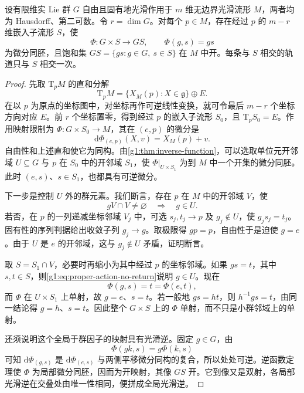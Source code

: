 \begin{lemma}\label{g1:lem:free-proper-local-product}
	设有限维实 Lie 群 \(G\) 自由且固有地光滑作用于 \(m\) 维无边界光滑流形 \(M\)，两者均为 Hausdorff、第二可数。令 \(r=\dim G\)。对每个 \(p\in M\)，存在经过 \(p\) 的 \(m-r\) 维嵌入子流形 \(S\)，使
	\begin{equation}\label{g1:eq:free-action-local-product}
		\Phi:G\times S\longrightarrow GS,\qquad \Phi(g,s)=gs
	\end{equation}
	为微分同胚，且饱和集 \(GS=\{gs:g\in G,\ s\in S\}\) 在 \(M\) 中开。每条与 \(S\) 相交的轨道只与 \(S\) 相交一次。
\end{lemma}
\begin{proof}
	先取 \(\mathrm{T}_pM\) 的直和分解
	\[
		\mathrm{T}_pM=\{X_M(p):X\in\mathfrak g\}\oplus E.
	\]
	在以 \(p\) 为原点的坐标图中，对坐标再作可逆线性变换，就可令最后 \(m-r\) 个坐标方向对应 \(E\)。前 \(r\) 个坐标置零，得到经过 \(p\) 的嵌入子流形 \(S_0\)，且 \(\mathrm{T}_pS_0=E\)。作用映射限制为 \(\Phi:G\times S_0\to M\)，其在 \((e,p)\) 的微分是
	\[
		\mathrm{d}\Phi_{(e,p)}(X,v)=X_M(p)+v.
	\]
	自由性和上述直和使它为同构。由\cref{g1:thm:inverse-function}，可以选取单位元开邻域 \(U\subseteq G\) 与 \(p\) 在 \(S_0\) 中的开邻域 \(S_1\)，使 \(\Phi|_{U\times S_1}\) 为到 \(M\) 中一个开集的微分同胚。此时 \((e,s)\)、\(s\in S_1\)，也都具有可逆微分。

	下一步是控制 \(U\) 外的群元素。我们断言，存在 \(p\) 在 \(M\) 中的开邻域 \(V\)，使
	\begin{equation}\label{g1:eq:proper-action-no-return}
		gV\cap V\ne\varnothing\quad\Longrightarrow\quad g\in U.
	\end{equation}
	若否，在 \(p\) 的一列递减坐标邻域 \(V_j\) 中，可选 \(s_j,t_j\to p\) 及 \(g_j\notin U\)，使 \(g_js_j=t_j\)。固有性的序列判据给出收敛子列 \(g_j\to g\)。取极限得 \(gp=p\)，自由性于是迫使 \(g=e\)。由于 \(U\) 是 \(e\) 的开邻域，这与 \(g_j\notin U\) 矛盾，证明断言。

	取 \(S=S_1\cap V\)，必要时再缩小为其中经过 \(p\) 的坐标邻域。如果 \(gs=t\)，其中 \(s,t\in S\)，则\eqref{g1:eq:proper-action-no-return}说明 \(g\in U\)。现在
	\[
		\Phi(g,s)=t=\Phi(e,t),
	\]
	而 \(\Phi\) 在 \(U\times S_1\) 上单射，故 \(g=e\)、\(s=t\)。若一般地 \(gs=ht\)，则 \(h^{-1}gs=t\)，由同一结论得 \(g=h\)、\(s=t\)。因此整个 \(G\times S\) 上的 \(\Phi\) 单射，而不只是小群邻域上的单射。

	还须说明这个全局于群因子的映射具有光滑逆。固定 \(g\in G\)，由
	\[
		\Phi(gk,s)=g\Phi(k,s)
	\]
	可知 \(\mathrm{d}\Phi_{(g,s)}\) 是 \(\mathrm{d}\Phi_{(e,s)}\) 与两侧平移微分同构的复合，所以处处可逆。逆函数定理使 \(\Phi\) 为局部微分同胚，因而为开映射，其像 \(GS\) 开。它到像又是双射，各局部光滑逆在交叠处由唯一性相同，便拼成全局光滑逆。
\end{proof}

